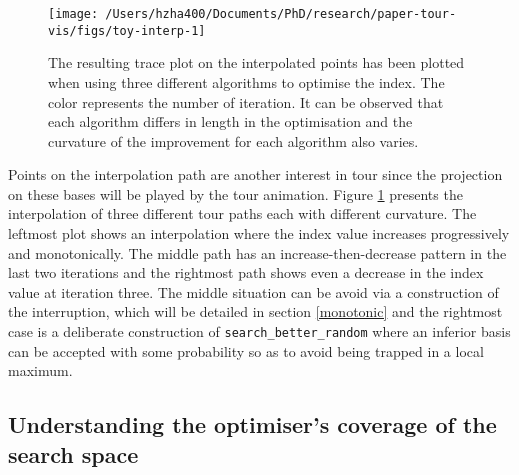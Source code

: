 \begin{Schunk}
\begin{figure}

{\centering \texttt{[image: /Users/hzha400/Documents/PhD/research/paper-tour-vis/figs/toy-interp-1]} 

}

\caption[The resulting trace plot on the interpolated points has been plotted when using three different algorithms to optimise the index]{The resulting trace plot on the interpolated points has been plotted when using three different algorithms to optimise the index. The color represents the number of iteration. It can be observed that each algorithm differs in length in the optimisation and the curvature of the improvement for each algorithm also varies.}\label{fig:toy-interp}
\end{figure}
\end{Schunk}

Points on the interpolation path are another interest in tour since the
projection on these bases will be played by the tour animation. Figure
\ref{fig:toy-interp} presents the interpolation of three different tour
paths each with different curvature. The leftmost plot shows an
interpolation where the index value increases progressively and
monotonically. The middle path has an increase-then-decrease pattern in
the last two iterations and the rightmost path shows even a decrease in
the index value at iteration three. The middle situation can be avoid
via a construction of the interruption, which will be detailed in
section \ref{monotonic} and the rightmost case is a deliberate
construction of \texttt{search\_better\_random} where an inferior basis
can be accepted with some probability so as to avoid being trapped in a
local maximum.

\hypertarget{understanding-the-optimisers-coverage-of-the-search-space}{%
\subsection{Understanding the optimiser's coverage of the search
space}\label{understanding-the-optimisers-coverage-of-the-search-space}}

